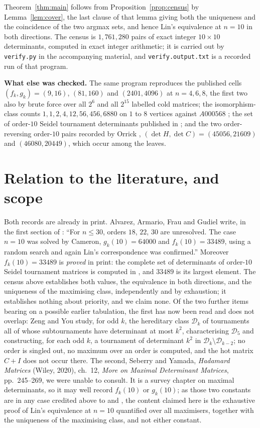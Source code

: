 \documentclass[11pt]{amsart}
\theoremstyle{remark}
\begin{document}
Theorem~\ref{thm:main} follows from Proposition~\ref{prop:census} by
Lemma~\ref{lem:cover}, the last clause of that lemma giving both the uniqueness and the
coincidence of the two argmax sets, and hence Lin's equivalence at $n=10$ in both
directions. The census is $1{,}761{,}280$ pairs of exact integer $10\times10$
determinants, computed in exact integer arithmetic; it is carried out by \texttt{verify.py}
in the accompanying material, and \texttt{verify.output.txt} is a recorded run of that
program.

\medskip
\noindent\textbf{What else was checked.} The same program reproduces the published cells
$(f_k,g_k)=(9,16)$, $(81,160)$ and $(2401,4096)$ at $n=4,6,8$, the first two also by brute
force over all $2^{6}$ and all $2^{15}$ labelled cold matrices; the isomorphism-class
counts $1,1,2,4,12,56,456,6880$ on $1$ to $8$ vertices against $A000568$ \cite{OEIS568};
the set of order-$10$ Seidel tournament determinants published in \cite{Klanderman2025};
and the two order-reversing order-$10$ pairs recorded by Orrick \cite{OrrickComment},
$(\det H,\det C)=(45056,21609)$ and $(46080,20449)$, which occur among the leaves.

\section{Relation to the literature, and scope}\label{sec:status}

Both records are already in print. Alvarez, Armario, Frau and Gudiel write, in the first
section of \cite{Alvarez2015}: ``For $n\leq30$, orders $18$, $22$, $30$ are unresolved.
The case $n=10$ was solved by Cameron, $g_k(10)=64000$ and $f_k(10)=33489$, using a random
search and again Lin's correspondence was confirmed.'' Moreover $f_k(10)=33489$ is
\emph{proved} in print: the complete set of determinants of order-$10$ Seidel tournament
matrices is computed in \cite{Klanderman2025}, and $33489$ is its largest element. The
census above establishes both values, the equivalence in both directions, and the
uniqueness of the maximising class, independently and by exhaustion; it establishes
nothing about priority, and we claim none. Of the two further items bearing on a possible
earlier tabulation, the first has now been read and does not overlap: Zeng and You
\cite{ZengYou2026} study, for odd $k$, the hereditary class $\mathcal D_k$ of tournaments
all of whose subtournaments have determinant at most $k^2$, characterising $\mathcal D_5$
and constructing, for each odd $k$, a tournament of determinant $k^2$ in
$\mathcal D_k\setminus\mathcal D_{k-2}$; no order is singled out, no maximum over an order
is computed, and the hot matrix $C+I$ does not occur there. The second, Seberry and
Yamada, \emph{Hadamard Matrices} (Wiley, 2020), ch.~12, \emph{More on Maximal Determinant
Matrices}, pp.~245--269, we were unable to consult. It is a survey chapter on maximal
determinants, so it may well record $f_k(10)$ or $g_k(10)$; as those two constants are in
any case credited above to \cite{Alvarez2015} and \cite{Klanderman2025}, the content
claimed here is the exhaustive proof of Lin's equivalence at $n=10$ quantified over all
maximisers, together with the uniqueness of the maximising class, and not either constant.
\end{document}
